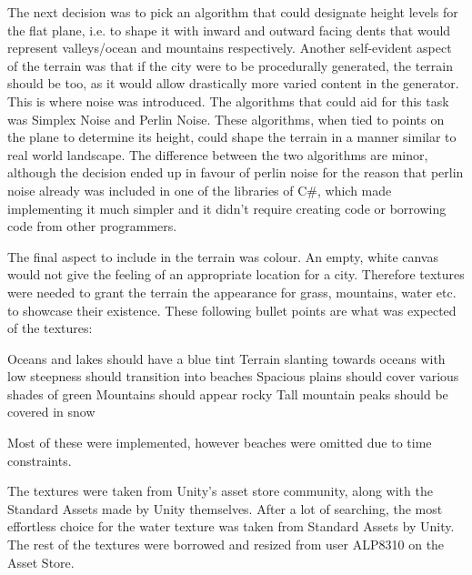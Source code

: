The next decision was to pick an algorithm that could designate height levels for the flat plane, i.e. to shape it with inward and outward facing dents that would represent valleys/ocean and mountains respectively.
Another self-evident aspect of the terrain was that if the city were to be procedurally generated, the terrain should be too, as it would allow drastically more varied content in the generator.
This is where noise was introduced.
The algorithms that could aid for this task was Simplex Noise and Perlin Noise.
These algorithms, when tied to points on the plane to determine its height, could shape the terrain in a manner similar to real world landscape.
The difference between the two algorithms are minor, although the decision ended up in favour of perlin noise for the reason that perlin noise already was included in one of the libraries of C#, which made implementing it much simpler and it didn’t require creating code or borrowing code from other programmers. 

The final aspect to include in the terrain was colour.
An empty, white canvas would not give the feeling of an appropriate location for a city.
Therefore textures were needed to grant the terrain the appearance for grass, mountains, water etc. to showcase their existence.
These following bullet points are what was expected of the textures:

Oceans and lakes should have a blue tint
Terrain slanting towards oceans with low steepness should transition into beaches
Spacious plains should cover various shades of green
Mountains should appear rocky
Tall mountain peaks should be covered in snow

Most of these were implemented, however beaches were omitted due to time constraints.

The textures were taken from Unity’s asset store community, along with the Standard Assets made by Unity themselves.
After a lot of searching, the most effortless choice for the water texture was taken from Standard Assets by Unity.
The rest of the textures were borrowed and resized from user ALP8310 on the Asset Store.
